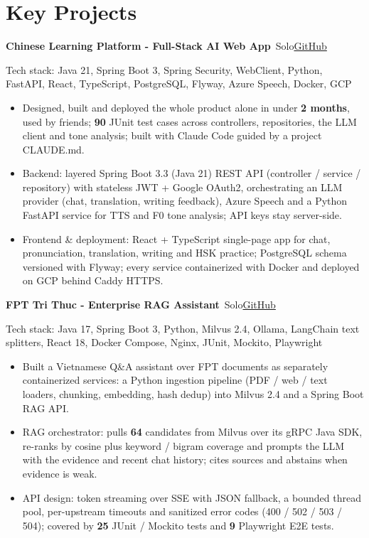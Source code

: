 \documentclass[10pt, a4paper]{article}
\newcommand{\project}[3]{\textbf{#1}\,{\color{MutedText}\textbar{} #2}\hfill\href{#3}{GitHub}\par}
\newcommand{\techstack}[1]{{\color{MutedText}Tech stack: #1}\par}
\begin{document}
\section{Key Projects}
\project{Chinese Learning Platform - Full-Stack AI Web App}{Solo}{https://github.com/minhphuong150505/Web_Chinese_Learning-}
\techstack{Java 21, Spring Boot 3, Spring Security, WebClient, Python, FastAPI, React, TypeScript, PostgreSQL, Flyway, Azure Speech, Docker, GCP}
\begin{itemize}
  \item Designed, built and deployed the whole product alone in under \textbf{2 months}, used by friends; \textbf{90} JUnit test cases across controllers, repositories, the LLM client and tone analysis; built with Claude Code guided by a project CLAUDE.md.
  \item Backend: layered Spring Boot 3.3 (Java 21) REST API (controller / service / repository) with stateless JWT + Google OAuth2, orchestrating an LLM provider (chat, translation, writing feedback), Azure Speech and a Python FastAPI service for TTS and F0 tone analysis; API keys stay server-side.
  \item Frontend \& deployment: React + TypeScript single-page app for chat, pronunciation, translation, writing and HSK practice; PostgreSQL schema versioned with Flyway; every service containerized with Docker and deployed on GCP behind Caddy HTTPS.
\end{itemize}
\vspace{2pt}
\project{FPT Tri Thuc - Enterprise RAG Assistant}{Solo}{https://github.com/minhphuong150505/milvus-rag-demo}
\techstack{Java 17, Spring Boot 3, Python, Milvus 2.4, Ollama, LangChain text splitters, React 18, Docker Compose, Nginx, JUnit, Mockito, Playwright}
\begin{itemize}
  \item Built a Vietnamese Q\&A assistant over FPT documents as separately containerized services: a Python ingestion pipeline (PDF / web / text loaders, chunking, embedding, hash dedup) into Milvus 2.4 and a Spring Boot RAG API.
  \item RAG orchestrator: pulls \textbf{64} candidates from Milvus over its gRPC Java SDK, re-ranks by cosine plus keyword / bigram coverage and prompts the LLM with the evidence and recent chat history; cites sources and abstains when evidence is weak.
  \item API design: token streaming over SSE with JSON fallback, a bounded thread pool, per-upstream timeouts and sanitized error codes (400 / 502 / 503 / 504); covered by \textbf{25} JUnit / Mockito tests and \textbf{9} Playwright E2E tests.
\end{itemize}
\end{document}
